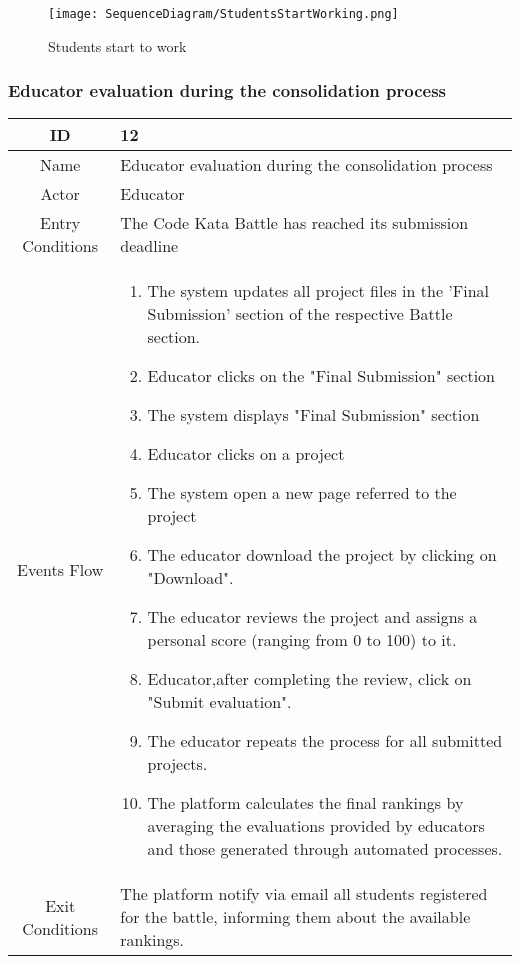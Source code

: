     \begin{figure}[H]
  \texttt{[image: SequenceDiagram/StudentsStartWorking.png]} 
  \caption{Students start to work}
  \label{fig:immagine}
\end{figure}

\newpage
\subsubsection{Educator evaluation during the consolidation process}
\begin{longtable}{|c| p{10cm}|}
        \hline
            ID & 12 \\
        \hline
            Name & Educator evaluation during the consolidation process \\
        \hline
            Actor & Educator\\
        \hline
            Entry Conditions &
            The Code Kata Battle has reached its submission deadline
                

        
         \\
        \hline
            Events Flow &   \begin{enumerate}
                              \item The system updates all project files in the 'Final Submission' section of the respective Battle section.
                              \item Educator clicks on the "Final Submission" section 
                              \item The system displays "Final Submission" section
                              \item  Educator clicks on a project
                              \item The system open a new page referred to the project
                              \item The educator download the project by clicking on "Download".
                                \item The educator reviews the project and assigns a personal score (ranging from 0 to 100) to it.
                                \item Educator,after completing the review, click on "Submit evaluation".
                                \item  The educator repeats the process for all submitted projects.
                                \item The  platform calculates the final rankings by averaging the evaluations provided by educators and those generated through automated processes.
                            \end{enumerate} \\
                            \hline
            Exit Conditions & The platform notify via email   all students registered for the battle, informing them about the available rankings.
    

\end{longtable}
